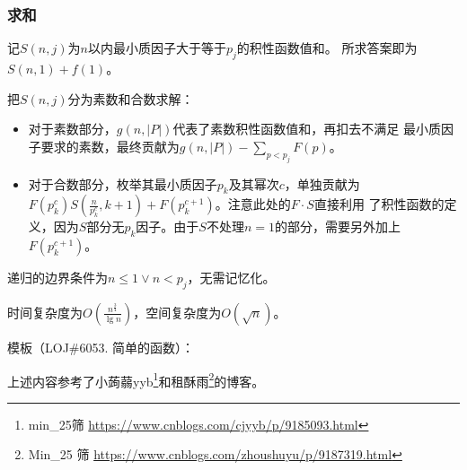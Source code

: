 \subsubsection{求和}
记$S(n,j)$为$n$以内最小质因子大于等于$p_j$的积性函数值和。
所求答案即为$S(n,1)+f(1)$。

把$S(n,j)$分为素数和合数求解：
\begin{itemize}
    \item 对于素数部分，$g(n,|P|)$代表了素数积性函数值和，再扣去不满足
    最小质因子要求的素数，最终贡献为$g(n,|P|)-\displaystyle \sum_{p<p_j}F(p)$。
    \item 对于合数部分，枚举其最小质因子$p_k$及其幂次$c$，单独贡献为\\
    $F(p_k^c)S(\frac{n}{p_k^c},k+1)+F(p_k^{c+1})$。注意此处的$F\cdot S$直接利用
    了积性函数的定义，因为$S$部分无$p_k$因子。由于$S$不处理$n=1$的部分，需要另外加上
    $F(p_k^{c+1})$。
\end{itemize}

递归的边界条件为$n\leq 1 \vee n<p_j$，无需记忆化。

时间复杂度为$O(\frac{n^\frac{3}{4}}{\lg n})$，空间复杂度为$O(\sqrt{n})$。

模板（LOJ\#6053. 简单的函数）：


上述内容参考了小蒟蒻yyb\footnote{
    min\_25筛
    \url{https://www.cnblogs.com/cjyyb/p/9185093.html}
}和租酥雨\footnote{
    Min\_25 筛
    \url{https://www.cnblogs.com/zhoushuyu/p/9187319.html}
}的博客。
